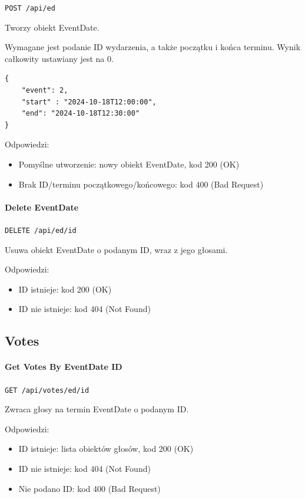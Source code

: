 \documentclass[a4paper,twoside,12pt]{book}
\begin{document}
\texttt{POST /api/ed}

Tworzy obiekt EventDate.

Wymagane jest podanie ID wydarzenia, a także początku i końca terminu. Wynik całkowity ustawiany jest na 0.

\begin{verbatim}
{
    "event": 2,
    "start" : "2024-10-18T12:00:00",
    "end": "2024-10-18T12:30:00"
}
\end{verbatim}

Odpowiedzi: 
\begin{itemize}
	\item Pomyślne utworzenie: nowy obiekt EventDate, kod 200 (OK) 
	\item Brak ID/terminu początkowego/końcowego: kod 400 (Bad Request)
\end{itemize}

\paragraph{Delete EventDate}\label{delete-eventdate}

\texttt{DELETE /api/ed/{id}}

Usuwa obiekt EventDate o podanym ID, wraz z jego głosami.

Odpowiedzi: 
\begin{itemize}
	\item ID istnieje: kod 200 (OK) 
	\item ID nie istnieje: kod 404 (Not Found)
\end{itemize}

\subsection{Votes}\label{votes}

\paragraph{Get Votes By EventDate ID}\label{get-votes-by-eventdate-id}

\texttt{GET /api/votes/ed/{id}}

Zwraca głosy na termin EventDate o podanym ID.

Odpowiedzi: 
\begin{itemize}
	\item ID istnieje: lista obiektów głosów, kod 200 (OK) 
	\item ID nie istnieje: kod 404 (Not Found) 
	\item Nie podano ID: kod 400 (Bad Request)
\end{itemize}
\end{document}
